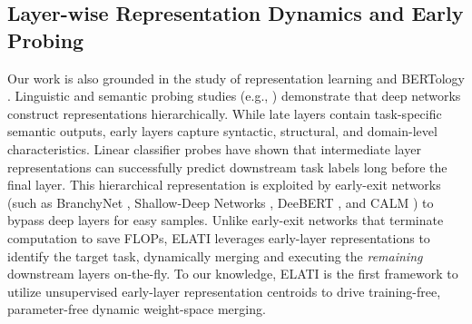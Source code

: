 \subsection{Layer-wise Representation Dynamics and Early Probing}
Our work is also grounded in the study of representation learning and BERTology \cite{rogers20bertology}.
Linguistic and semantic probing studies (e.g., \cite{tenney19pipeline, liu19linguistic, belinkov22probing}) demonstrate that deep networks construct representations hierarchically.
While late layers contain task-specific semantic outputs, early layers capture syntactic, structural, and domain-level characteristics.
Linear classifier probes \cite{alain16probing, conneau18probe} have shown that intermediate layer representations can successfully predict downstream task labels long before the final layer.
This hierarchical representation is exploited by early-exit networks (such as BranchyNet \cite{teerapittayanon16branchynet}, Shallow-Deep Networks \cite{kaya19sdn}, DeeBERT \cite{xin20deebert}, and CALM \cite{schuster22calm}) to bypass deep layers for easy samples.
Unlike early-exit networks that terminate computation to save FLOPs, ELATI leverages early-layer representations to identify the target task, dynamically merging and executing the \emph{remaining} downstream layers on-the-fly.
To our knowledge, ELATI is the first framework to utilize unsupervised early-layer representation centroids to drive training-free, parameter-free dynamic weight-space merging.
